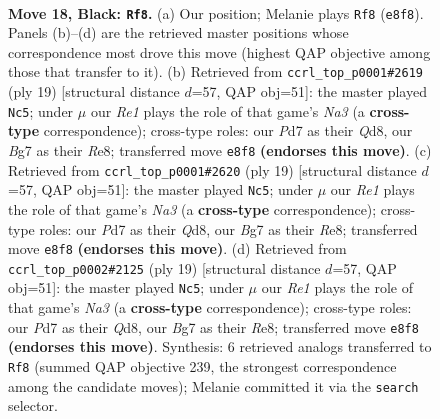 \documentclass[11pt]{article}
\begin{document}
\clearpage

\begin{figure}[p]\centering
\begin{subfigure}{0.46\textwidth}\centering
\resizebox{\linewidth}{!}{%
\newchessgame
\chessboard[
  setfen={r1bqr2k/1p1pppbp/p2n4/3Q4/2P5/2NP1N2/PP3PBP/R1B2RK1 b - - 0 18},
  showmover=false,
  pgfstyle=straightmove, color=movearrow, markmove={e8-f8}
]}
\caption{}
\end{subfigure}\hfill
\begin{subfigure}{0.46\textwidth}\centering
\resizebox{\linewidth}{!}{%
\newchessgame
\chessboard[
  setfen={r1bqr1k1/pp1pbppp/n1p2n2/8/2PQ4/2N2NP1/PP2PPBP/R1B2RK1 b - - 12 10},
  showmover=false,
  pgfstyle=straightmove, color=movearrow, markmove={a6-c5}
]}
\caption{}
\end{subfigure}
\\[4pt]
\begin{subfigure}{0.46\textwidth}\centering
\resizebox{\linewidth}{!}{%
\newchessgame
\chessboard[
  setfen={r1bqr1k1/pp1pbppp/n1p2n2/8/2PQ4/2N2NP1/PP2PPBP/R1B2RK1 b - - 12 10},
  showmover=false,
  pgfstyle=straightmove, color=movearrow, markmove={a6-c5}
]}
\caption{}
\end{subfigure}\hfill
\begin{subfigure}{0.46\textwidth}\centering
\resizebox{\linewidth}{!}{%
\newchessgame
\chessboard[
  setfen={r1bqr1k1/pp1pbppp/n1p2n2/8/2PQ4/2N2NP1/PP2PPBP/R1B2RK1 b - - 12 10},
  showmover=false,
  pgfstyle=straightmove, color=movearrow, markmove={a6-c5}
]}
\caption{}
\end{subfigure}
\caption{\textbf{Move 18, Black: \texttt{Rf8}.} (a) Our position; Melanie plays \texttt{Rf8} (\texttt{e8f8}). Panels (b)--(d) are the retrieved master positions whose correspondence most drove this move (highest QAP objective among those that transfer to it). (b) Retrieved from \texttt{ccrl\_top\_p0001\#2619} (ply 19) [structural distance $d$=57, QAP obj=51]: the master played \texttt{Nc5}; under $\mu$ our \emph{Re1} plays the role of that game's \emph{Na3} (a \textbf{cross-type} correspondence); cross-type roles: our \emph{P}d7 as their \emph{Q}d8, our \emph{B}g7 as their \emph{R}e8; transferred move \texttt{e8f8} \textbf{(endorses this move)}. (c) Retrieved from \texttt{ccrl\_top\_p0001\#2620} (ply 19) [structural distance $d$=57, QAP obj=51]: the master played \texttt{Nc5}; under $\mu$ our \emph{Re1} plays the role of that game's \emph{Na3} (a \textbf{cross-type} correspondence); cross-type roles: our \emph{P}d7 as their \emph{Q}d8, our \emph{B}g7 as their \emph{R}e8; transferred move \texttt{e8f8} \textbf{(endorses this move)}. (d) Retrieved from \texttt{ccrl\_top\_p0002\#2125} (ply 19) [structural distance $d$=57, QAP obj=51]: the master played \texttt{Nc5}; under $\mu$ our \emph{Re1} plays the role of that game's \emph{Na3} (a \textbf{cross-type} correspondence); cross-type roles: our \emph{P}d7 as their \emph{Q}d8, our \emph{B}g7 as their \emph{R}e8; transferred move \texttt{e8f8} \textbf{(endorses this move)}. Synthesis: 6 retrieved analogs transferred to \texttt{Rf8} (summed QAP objective 239, the strongest correspondence among the candidate moves); Melanie committed it via the \texttt{search} selector.}
\label{fig:thought-m35}
\end{figure}
\end{document}
